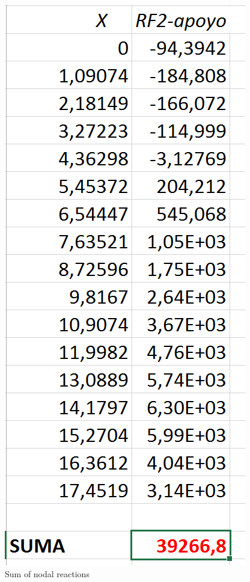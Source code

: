 \documentclass[english,a4paper,12pt]{article}
\begin{document}
\begin{figure}[!htbp]
\centering
\includegraphics[scale=0.45]{capturas2019/a_fig44p1.png}
\caption{Sum of nodal reactions}
\label{fig:suma-reac-nod}
\end{figure}
\end{document}
